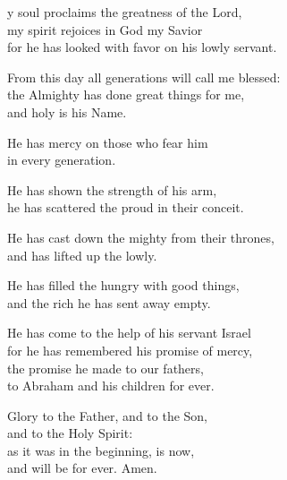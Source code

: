 \begin{psalmverse}
  \begin{patverse}
y soul proclaims the greatness of the Lord,\Flex\\
my spirit rejoices in God my Savior\Med\\
for he has looked with favor on his lowly servant.

From this day all generations will call me blessed:\Flex\\
the Almighty has done great things for me,\Med\\
and holy is his Name.

He has mercy on those who fear him\Med\\
in every generation.

He has shown the strength of his arm,\Med\\
he has scattered the proud in their conceit.

He has cast down the mighty from their thrones,\Med\\
and has lifted up the lowly.

He has filled the hungry with good things,\Med\\
and the rich he has sent away empty.

He has come to the help of his servant Israel\Med\\
for he has remembered his promise of mercy,\\
the promise he made to our fathers,\Med\\
to Abraham and his children for ever.

Glory to the Father, and to the Son,\Med\\
and to the Holy Spirit:\\
as it was in the beginning, is now,\Med\\
and will be for ever. Amen.
  \end{patverse}
\end{psalmverse}
